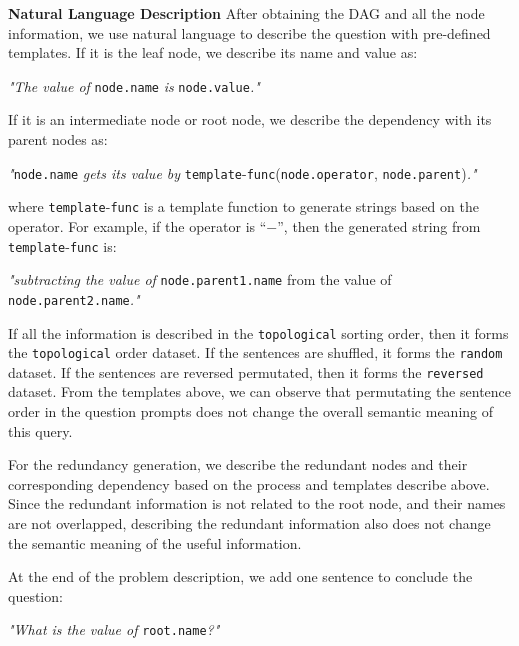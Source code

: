 \textbf{Natural Language Description}
After obtaining the DAG and all the node information, we use natural language to describe the question with pre-defined templates. If it is the leaf node, we describe its name and value as: 
\begin{tcolorbox}[colback=blue!2!white, colframe=blue!80!black, boxrule=0.5pt]
\small
\textit{"The value of} \texttt{node.name} \textit{is} \texttt{node.value}\textit{."}
\end{tcolorbox}

If it is an intermediate node or root node, we describe the dependency with its parent nodes as:

\begin{tcolorbox}[colback=blue!2!white, colframe=blue!80!black, boxrule=0.5pt]
\small
\textit{"}\texttt{node.name} \textit{gets its value by}  \texttt{template}-\texttt{func}(\texttt{node.operator}, \texttt{node.parent})\textit{."}
\end{tcolorbox}
where \texttt{template}-\texttt{func} is a template function to generate strings based on the operator. For example, if the operator is ``$-$'', then the generated string from \texttt{template}-\texttt{func} is:

\begin{tcolorbox}[colback=blue!2!white, colframe=blue!80!black, boxrule=0.5pt]
\small
\textit{"subtracting the value of} \texttt{node.parent1.name} from the value of \texttt{node.parent2.name}\textit{."}
\end{tcolorbox}

If all the information is described in the \texttt{topological} sorting order, then it forms the \texttt{topological} order dataset. If the sentences are shuffled, it forms the \texttt{random} dataset. If the sentences are reversed permutated, then it forms the \texttt{reversed} dataset. From the templates above, we can observe that permutating the sentence order in the question prompts does not change the overall semantic meaning of this query.

For the redundancy generation, we describe the redundant nodes and their corresponding dependency based on the process and templates describe above. Since the redundant information is not related to the root node, and their names are not overlapped, describing the redundant information also does not change the semantic meaning of the useful information.

At the end of the problem description, we add one sentence to conclude the question:
\begin{tcolorbox}[colback=blue!2!white, colframe=blue!80!black, boxrule=0.5pt]
\small
\textit{"What is the value of} \texttt{root.name}\textit{?"}
\end{tcolorbox}

